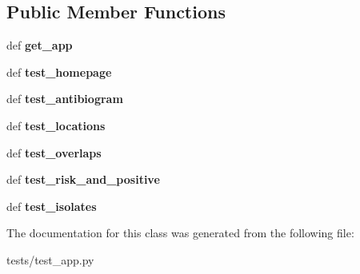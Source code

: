 \subsection*{Public Member Functions}
\begin{DoxyCompactItemize}
\item 
\hypertarget{classtests_1_1test__app_1_1_g_i_s_m_o_h___app___test_a53a84724496d67cbb077c0767fee154d}{def {\bfseries get\-\_\-app}}\label{classtests_1_1test__app_1_1_g_i_s_m_o_h___app___test_a53a84724496d67cbb077c0767fee154d}

\item 
\hypertarget{classtests_1_1test__app_1_1_g_i_s_m_o_h___app___test_a9fa38921e241bc3971d7d14e1d2170bf}{def {\bfseries test\-\_\-homepage}}\label{classtests_1_1test__app_1_1_g_i_s_m_o_h___app___test_a9fa38921e241bc3971d7d14e1d2170bf}

\item 
\hypertarget{classtests_1_1test__app_1_1_g_i_s_m_o_h___app___test_a7282590aa14e92d021f124e6f25c14de}{def {\bfseries test\-\_\-antibiogram}}\label{classtests_1_1test__app_1_1_g_i_s_m_o_h___app___test_a7282590aa14e92d021f124e6f25c14de}

\item 
\hypertarget{classtests_1_1test__app_1_1_g_i_s_m_o_h___app___test_a305064308d63b240b65f6fcb3792e92c}{def {\bfseries test\-\_\-locations}}\label{classtests_1_1test__app_1_1_g_i_s_m_o_h___app___test_a305064308d63b240b65f6fcb3792e92c}

\item 
\hypertarget{classtests_1_1test__app_1_1_g_i_s_m_o_h___app___test_aad06fc302e0a97b1b15f9e9b4627e4e6}{def {\bfseries test\-\_\-overlaps}}\label{classtests_1_1test__app_1_1_g_i_s_m_o_h___app___test_aad06fc302e0a97b1b15f9e9b4627e4e6}

\item 
\hypertarget{classtests_1_1test__app_1_1_g_i_s_m_o_h___app___test_a79bff92371080b7d938e418e13c697a8}{def {\bfseries test\-\_\-risk\-\_\-and\-\_\-positive}}\label{classtests_1_1test__app_1_1_g_i_s_m_o_h___app___test_a79bff92371080b7d938e418e13c697a8}

\item 
\hypertarget{classtests_1_1test__app_1_1_g_i_s_m_o_h___app___test_a3b86d2c0acbe63623819cd42854444d0}{def {\bfseries test\-\_\-isolates}}\label{classtests_1_1test__app_1_1_g_i_s_m_o_h___app___test_a3b86d2c0acbe63623819cd42854444d0}

\end{DoxyCompactItemize}


The documentation for this class was generated from the following file\-:\begin{DoxyCompactItemize}
\item 
tests/test\-\_\-app.\-py\end{DoxyCompactItemize}
